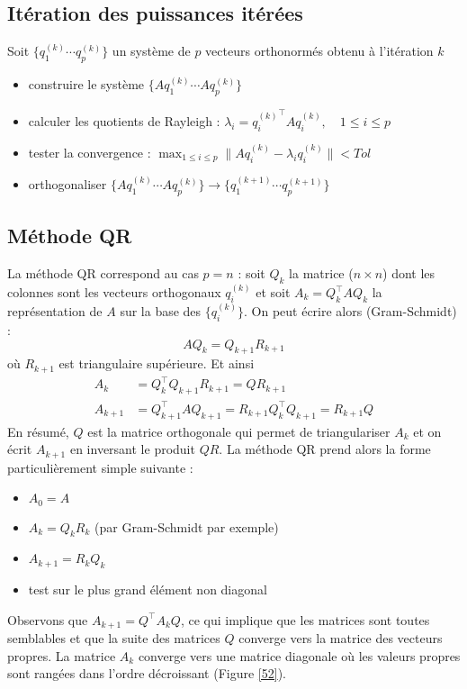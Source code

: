 \subsection{Itération des puissances itérées}

Soit $\{q_1^{(k)}\cdots q_p^{(k)}\}$ un système de $p$ vecteurs orthonormés obtenu à l'itération $k$
\begin{itemize}
	\item construire le système $\{Aq_1^{(k)}\cdots Aq_p^{(k)}\}$
	\item calculer les quotients de Rayleigh : $\lambda_i={q^{(k)}_i}^\top Aq_i^{(k)},\quad 1\leq i\leq p$
	\item tester la convergence : $\displaystyle\max_{1\leq i\leq p} \|Aq_i^{(k)}-\lambda_i q_i^{(k)} \|<Tol$
	\item orthogonaliser $\{Aq_1^{(k)}\cdots Aq_p^{(k)}\} \rightarrow \{q_1^{(k+1)}\cdots q_p^{(k+1)}\}$
\end{itemize}

\subsection{Méthode QR}  %

La méthode QR correspond au cas $p=n$ : soit $Q_k$ la matrice ($n\times n$) dont les colonnes sont les vecteurs orthogonaux $q_i^{(k)}$ et soit $A_k=Q_k^\top AQ_k$ la représentation de $A$ sur la base des $\{q_i^{(k)}\}$. On peut écrire alors (Gram-Schmidt) : 
$$
AQ_k=Q_{k+1}R_{k+1}
$$ 
où $R_{k+1}$ est triangulaire supérieure. Et ainsi 
\begin{align*}
A_k&=Q_k^\top Q_{k+1}R_{k+1}=QR_{k+1}\\
A_{k+1}&=Q_{k+1}^\top AQ_{k+1}=R_{k+1}Q_k^\top Q_{k+1}=R_{k+1}Q
\end{align*}
En résumé, $Q$ est la matrice orthogonale qui permet de triangulariser $A_k$ et on écrit $A_{k+1}$ en inversant le produit $QR$. La méthode QR prend alors la forme particulièrement simple suivante :
\begin{itemize}
	\item $A_0=A$
	\item $A_k=Q_kR_k$ (par Gram-Schmidt par exemple)
	\item $A_{k+1}=R_kQ_k$
	\item test sur le plus grand élément non diagonal
\end{itemize}
\vskip 10pt
Observons que $A_{k+1}=Q^\top A_kQ$, ce qui implique que les matrices sont toutes semblables et que la suite des matrices  $Q$ converge vers la matrice des vecteurs propres. La matrice $A_k$ converge vers une matrice diagonale où les valeurs propres sont rangées dans l'ordre décroissant (Figure \ref{52}). 


